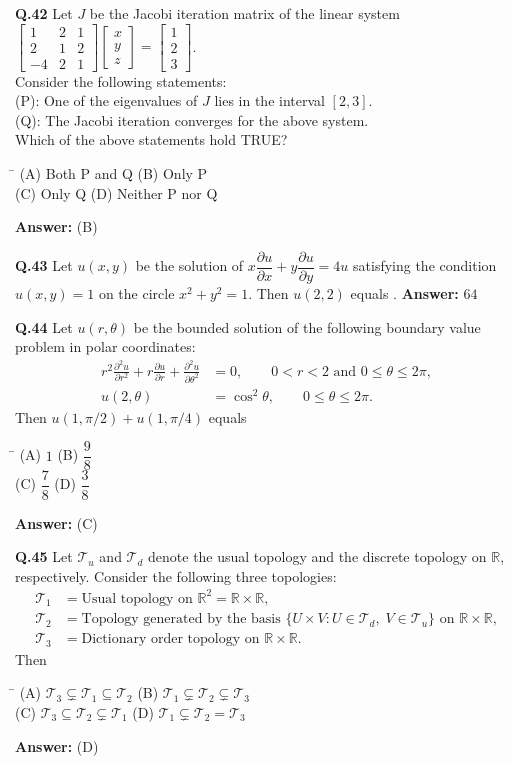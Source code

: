 \documentclass[11pt,a4paper]{article}
\newcommand{\optsfourA}[4]{%
  \begin{tabbing}
    \hspace{0.48\linewidth}\=\kill
    (A) #1 \> (B) #2 \\[2pt]
    (C) #3 \> (D) #4
  \end{tabbing}%
}
\newcommand{\ans}[1]{\textbf{Answer:} #1\par\medskip}
\begin{document}
\textbf{Q.42} Let $J$ be the Jacobi iteration matrix of the linear system $\begin{bmatrix} 1 & 2 & 1 \\ 2 & 1 & 2 \\ -4 & 2 & 1 \end{bmatrix} \begin{bmatrix} x \\ y \\ z \end{bmatrix} = \begin{bmatrix} 1 \\ 2 \\ 3 \end{bmatrix}$.\\
Consider the following statements:\\
(P): One of the eigenvalues of $J$ lies in the interval $[2, 3]$.\\
(Q): The Jacobi iteration converges for the above system.\\
Which of the above statements hold TRUE?
\optsfourA{Both P and Q}{Only P}{Only Q}{Neither P nor Q}
\ans{(B)}

\textbf{Q.43} Let $u(x, y)$ be the solution of $x\dfrac{\partial u}{\partial x} + y\dfrac{\partial u}{\partial y} = 4u$ satisfying the condition $u(x, y) = 1$ on the circle $x^2 + y^2 = 1$. Then $u(2, 2)$ equals \underline{\hspace{2cm}}.
\ans{$64$}

\textbf{Q.44} Let $u(r, \theta)$ be the bounded solution of the following boundary value problem in polar coordinates:
\begin{align*}
  r^2 \frac{\partial^2 u}{\partial r^2} + r\frac{\partial u}{\partial r} + \frac{\partial^2 u}{\partial \theta^2} &= 0, \qquad 0 < r < 2 \text{ and } 0 \le \theta \le 2\pi, \\
  u(2, \theta) &= \cos^2 \theta, \qquad 0 \le \theta \le 2\pi.
\end{align*}
Then $u(1, \pi/2) + u(1, \pi/4)$ equals
\optsfourA{$1$}{$\dfrac{9}{8}$}{$\dfrac{7}{8}$}{$\dfrac{3}{8}$}
\ans{(C)}

\textbf{Q.45} Let $\mathcal{T}_u$ and $\mathcal{T}_d$ denote the usual topology and the discrete topology on $\mathbb{R}$, respectively. Consider the following three topologies:
\begin{align*}
  \mathcal{T}_1 &= \text{Usual topology on } \mathbb{R}^2 = \mathbb{R} \times \mathbb{R}, \\
  \mathcal{T}_2 &= \text{Topology generated by the basis } \{U \times V : U \in \mathcal{T}_d,\; V \in \mathcal{T}_u\} \text{ on } \mathbb{R} \times \mathbb{R}, \\
  \mathcal{T}_3 &= \text{Dictionary order topology on } \mathbb{R} \times \mathbb{R}.
\end{align*}
Then
\optsfourA{$\mathcal{T}_3 \subsetneq \mathcal{T}_1 \subseteq \mathcal{T}_2$}{$\mathcal{T}_1 \subsetneq \mathcal{T}_2 \subsetneq \mathcal{T}_3$}{$\mathcal{T}_3 \subseteq \mathcal{T}_2 \subsetneq \mathcal{T}_1$}{$\mathcal{T}_1 \subsetneq \mathcal{T}_2 = \mathcal{T}_3$}
\ans{(D)}
\end{document}

